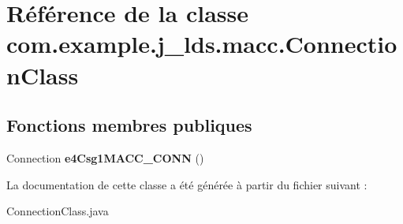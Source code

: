 \hypertarget{a00036}{}\section{Référence de la classe com.\+example.\+j\+\_\+lds.\+macc.\+Connection\+Class}
\label{a00036}
\subsection*{Fonctions membres publiques}
\begin{DoxyCompactItemize}
\item 
\mbox{\label{a00036_a8062c1d9a0755d76fe2eab4abf78bcd9}} 
Connection {\bfseries e4\+Csg1\+M\+A\+C\+C\+\_\+\+C\+O\+NN} ()
\end{DoxyCompactItemize}


La documentation de cette classe a été générée à partir du fichier suivant \+:\begin{DoxyCompactItemize}
\item 
Connection\+Class.\+java\end{DoxyCompactItemize}
